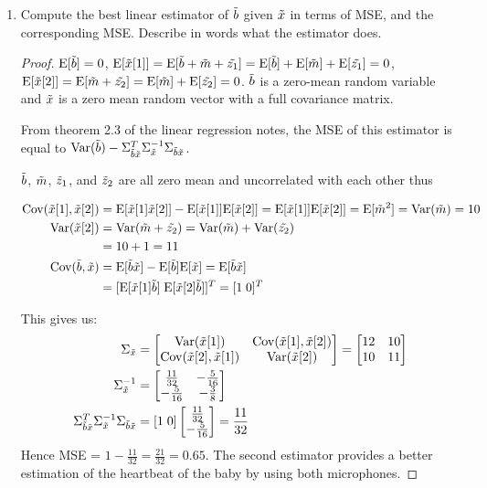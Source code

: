 \documentclass[12pt,twoside]{article}
\begin{document}
\begin{enumerate}
\begin{enumerate}
\item Compute the best linear estimator of $\tilde{  b }$ given $\tilde{  x }$ in terms of MSE, and the corresponding MSE. Describe in words what the estimator does. 

\begin{proof}

$\mathrm{E}[\tilde{  b }]=0$, $\mathrm{E}[\tilde{  x }[1]] = \mathrm{E}[\tilde{  b } + \tilde{ m } + \tilde{ z_1 }] = \mathrm{E}[\tilde{  b }] + \mathrm{E}[\tilde{ m } ] + \mathrm{E}[\tilde{ z_1 }]  = 0$, $\mathrm{E}[\tilde{  x }[2]] = \mathrm{E}[\tilde{ m } + \tilde{ z_2 }] = \mathrm{E}[\tilde{ m }] + \mathrm{E}[\tilde{ z_2 }] = 0$.
$\tilde{  b }$ is a zero-mean random variable and $\tilde{  x }$ is a zero mean random vector with a full covariance matrix. 

From theorem 2.3 of the linear regression notes, the MSE of this estimator is equal to $\var(\rb) - \Sigma_{\rb\rx}^T \Sigma_{\rx}^{-1} \Sigma_{\rb\rx}$.

$\tilde{  b }$, $\tilde{ m }$, $\tilde{ z }_1$, and $\tilde{ z }_2$ are all zero mean and uncorrelated with each other thus

\begin{align*}
	\cov(\rx[1], \rx[2]) 	&= 	\E[\rx[1]  \rx[2]] - \E[\rx[1]] \E[\rx[2]] = \E[\rx[1]]  \E[\rx[2]] = \E[\rnd{m}^2] = \var(\rnd{m}) = 10	\\
	 \var(\rx[2])		&=	\var(\rnd{m} + \rnd{z_2}) = \var(\rnd{m}) + \var(\rnd{z_2}) 	\\
	 				&=	10 + 1 = 11	\\
	\cov(\rb, \rx)		&=	\E[\rb \rx] - \E[\rb] \E[\rx] = \E[\rb \rx] \\
					&= 	[\E[\rx[1] \rb] \; \E[\rx[2] \rb]]^T = [1 \; 0]^T
\end{align*}



This gives us:
\begin{align*}
	\Sigma_{\rx} &= 
	\begin{bmatrix}
		\var(\rx[1])	&			\cov(\rx[1], \rx[2]) \\
		\cov(\rx[2], \rx[1])	&	\var(\rx[2])		\\
	\end{bmatrix}
	=
	\begin{bmatrix}
		12	&	10 \\
		10	&	11 
	\end{bmatrix} \\
	\Sigma_{\rx}^{-1} &= 
	\begin{bmatrix}
		\frac{11}{32}	&	-\frac{5}{16} \\
		-\frac{5}{16}	&	-\frac{3}{8}
	\end{bmatrix} \\
	\Sigma_{\rb\rx}^T \Sigma_{\rx}^{-1} \Sigma_{\rb\rx} &=
	[1 \; 0] 	\begin{bmatrix} \frac{11}{32} \\ -\frac{5}{16} \end{bmatrix} = \frac{11}{32}
\end{align*}
Hence MSE = $ 1 - \frac{11}{32} = \frac{21}{32} = 0.65$. The second estimator provides a better estimation of the heartbeat of the baby by using both microphones.


\end{proof}
\end{enumerate}
\end{enumerate}
\end{document}
